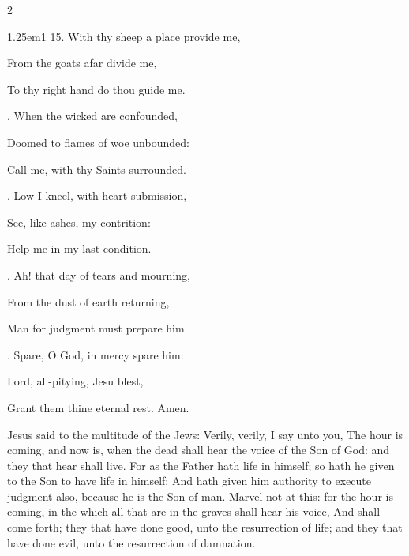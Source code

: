 \begin{multicols}{2}
\begin{hangparas}{1.25em}{1}
15. With thy sheep a place provide me,\par\noindent
From the goats afar divide me,\par\noindent
To thy right hand do thou guide me.\\
\par{}. When the wicked are confounded,\par\noindent
Doomed to flames of woe unbounded:\par\noindent
Call me, with thy Saints surrounded.\\
\par{}. Low I kneel, with heart submission,\par\noindent
See, like ashes, my contrition:\par\noindent
Help me in my last condition.\\
\par{}. Ah! that day of tears and mourning,\par\noindent
From the dust of earth returning,\par\noindent
Man for judgment must prepare him.\\
\par{}. Spare, O God, in mercy spare him:\par\noindent
Lord, all-pitying, Jesu blest,\par\noindent
Grant them thine eternal rest. Amen.
\end{hangparas}
\end{multicols}


 Jesus said to the multitude of the Jews: Verily, verily, I say unto you, The hour is coming, and now is, when the dead shall hear the voice of the Son of God: and they that hear shall live. For as the Father hath life in himself; so hath he given to the Son to have life in himself; And hath given him authority to execute judgment also, because he is the Son of man. Marvel not at this: for the hour is coming, in the which all that are in the graves shall hear his voice, And shall come forth; they that have done good, unto the resurrection of life; and they that have done evil, unto the resurrection of damnation.



